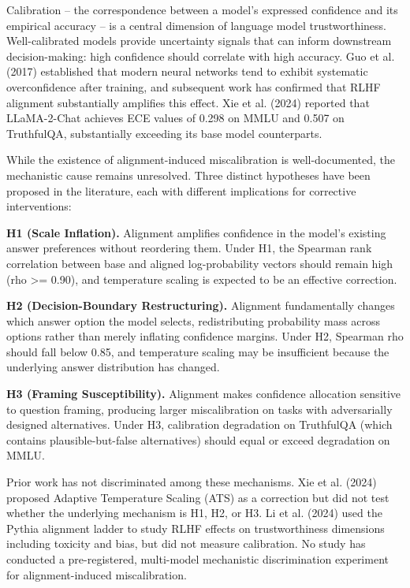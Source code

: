
Calibration -- the correspondence between a model's expressed confidence and its empirical accuracy -- is a central dimension of language model trustworthiness. Well-calibrated models provide uncertainty signals that can inform downstream decision-making: high confidence should correlate with high accuracy. Guo et al. (2017) established that modern neural networks tend to exhibit systematic overconfidence after training, and subsequent work has confirmed that RLHF alignment substantially amplifies this effect. Xie et al. (2024) reported that LLaMA-2-Chat achieves ECE values of 0.298 on MMLU and 0.507 on TruthfulQA, substantially exceeding its base model counterparts.

While the existence of alignment-induced miscalibration is well-documented, the mechanistic cause remains unresolved. Three distinct hypotheses have been proposed in the literature, each with different implications for corrective interventions:

\textbf{H1 (Scale Inflation).} Alignment amplifies confidence in the model's existing answer preferences without reordering them. Under H1, the Spearman rank correlation between base and aligned log-probability vectors should remain high (rho >= 0.90), and temperature scaling is expected to be an effective correction.

\textbf{H2 (Decision-Boundary Restructuring).} Alignment fundamentally changes which answer option the model selects, redistributing probability mass across options rather than merely inflating confidence margins. Under H2, Spearman rho should fall below 0.85, and temperature scaling may be insufficient because the underlying answer distribution has changed.

\textbf{H3 (Framing Susceptibility).} Alignment makes confidence allocation sensitive to question framing, producing larger miscalibration on tasks with adversarially designed alternatives. Under H3, calibration degradation on TruthfulQA (which contains plausible-but-false alternatives) should equal or exceed degradation on MMLU.

Prior work has not discriminated among these mechanisms. Xie et al. (2024) proposed Adaptive Temperature Scaling (ATS) as a correction but did not test whether the underlying mechanism is H1, H2, or H3. Li et al. (2024) used the Pythia alignment ladder to study RLHF effects on trustworthiness dimensions including toxicity and bias, but did not measure calibration. No study has conducted a pre-registered, multi-model mechanistic discrimination experiment for alignment-induced miscalibration.

